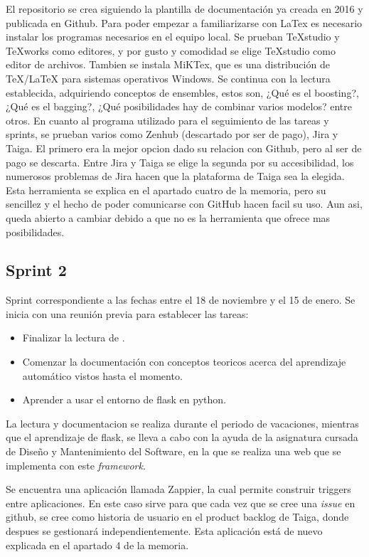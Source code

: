 El repositorio se crea siguiendo la plantilla de documentación ya creada en 2016 y publicada en Github. Para poder empezar a familiarizarse con LaTex es necesario instalar los programas necesarios en el equipo local. Se prueban TeXstudio y TeXworks como editores, y por gusto y comodidad se elige TeXstudio como editor de archivos. Tambien se instala MiKTex, que es una distribución de TeX/LaTeX para sistemas operativos Windows.
Se continua con la lectura establecida, adquiriendo conceptos de ensembles, estos son, ¿Qué es el boosting?, ¿Qué es el bagging?, ¿Qué posibilidades hay de combinar varios modelos? entre otros.
En cuanto al programa utilizado para el seguimiento de las tareas y sprints, se prueban varios como Zenhub (descartado por ser de pago), Jira y Taiga. El primero era la mejor opcion dado su relacion con Github, pero al ser de pago se descarta. Entre Jira y Taiga se elige la segunda por su accesibilidad, los numerosos problemas de Jira hacen que la plataforma de Taiga sea la elegida.
Esta herramienta se explica en el apartado cuatro de la memoria, pero su sencillez y el hecho de poder comunicarse con GitHub hacen facil su uso. Aun asi, queda abierto a cambiar debido a que no es la herramienta que ofrece mas posibilidades.
\subsection{Sprint 2}
Sprint correspondiente a las fechas entre el 18 de noviembre y el 15 de enero. Se inicia con una reunión previa para establecer las tareas: 
\begin{itemize}
	\item Finalizar la lectura de \cite{ensembles}.
	\item Comenzar la documentación con conceptos teoricos acerca del aprendizaje automático vistos hasta el momento.
	\item  Aprender a usar el entorno de flask en python.
\end{itemize}

La lectura y documentacion se realiza durante el periodo de vacaciones, mientras que el aprendizaje de flask, se lleva a cabo con la ayuda de la asignatura cursada de Diseño y Mantenimiento del Software, en la que se realiza una web que se implementa con este \textit{framework}.

Se encuentra una aplicación llamada Zappier, la cual permite construir triggers entre aplicaciones. En este caso sirve para que cada vez que se cree una \textit{issue} en github, se cree como historia de usuario en el product backlog de Taiga, donde despues se gestionará independientemente. Esta aplicación está de nuevo explicada en el apartado 4 de la memoria. 
